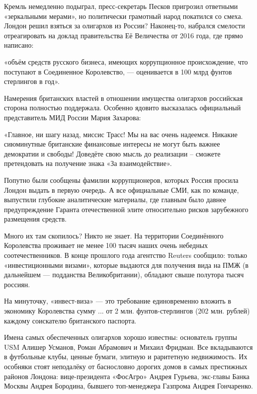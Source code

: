 Кремль немедленно подыграл, пресс-секретарь Песков пригрозил ответными
«зеркальными мерами», но политически грамотный народ покатился со смеха. Лондон
решил взяться за олигархов из России? Наконец-то, набрался смелости
отреагировать на доклад правительства Её Величества от 2016 года, где прямо
написано:

\begin{zznagolos}
«объём средств русского бизнеса, имеющих коррупционное происхождение, что
поступают в Соединенное Королевство, — оценивается в 100 млрд фунтов стерлингов
в год».	
\end{zznagolos}

Намерения британских властей в отношении имущества олигархов российская сторона
полностью поддержала. Особенно ядовито высказалась официальный представитель
МИД России Мария Захарова:

\begin{zznagolos}
«Главное, ни шагу назад, миссис Трасс! Мы на вас очень надеемся. Никакие
сиюминутные британские финансовые интересы не могут быть важнее демократии и
свободы! Доведёте свою мысль до реализации – сможете претендовать на получение
знака «За взаимодействие».	
\end{zznagolos}

Попутно были сообщены фамилии коррупционеров, которых Россия просила Лондон
выдать в первую очередь. А все официальные СМИ, как по команде, выпустили
глубокие аналитические материалы, где главным было давнее предупреждение
Гаранта отечественной элите относительно рисков зарубежного размещения средств.


Много их там скопилось? Никто не знает. На территории Соединённого Королевства
проживает не менее 100 тысяч наших очень небедных соотечественников. В конце
прошлого года агентство Reuters сообщило: только «инвестиционными визами»,
которые выдаются для получения вида на ПМЖ (в дальнейшем — подданства
Великобритании), обладают свыше полутора тысяч россиян.

На минуточку, «инвест-виза» — это требование единовременно вложить в экономику
Королевства сумму ... от 2 млн. фунтов-стерлингов (202 млн. рублей) каждому
соискателю британского паспорта.

Имена самых обеспеченных олигархов хорошо известны: основатель группы USM
Алишер Усманов, Роман Абрамович и Михаил Фридман. Все вкладываются в футбольные
клубы, ценные бумаги, элитную и раритетную недвижимость. Их особняки стоят
неподалёку от баснословно дорогих домов в самых престижных районов Лондона:
вице-президента «ФосАгро» Андрея Гурьева, экс-главы Банка Москвы Андрея
Бородина, бывшего топ-менеджера Газпрома Андрея Гончаренко.


